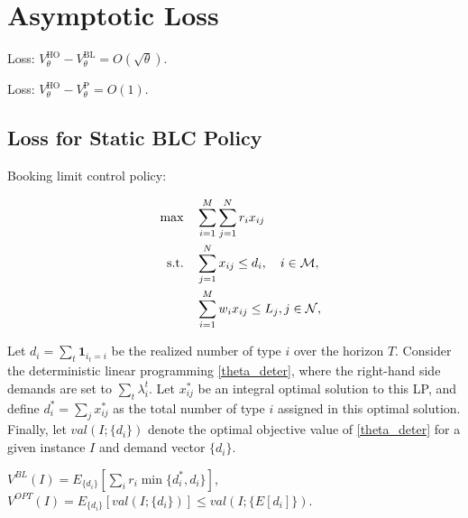 \section{Asymptotic Loss}


\begin{prop}
    Loss: $V_{\theta}^{\text{HO}} - V_{\theta}^{\text{BL}} = O(\sqrt{\theta})$. 
\end{prop}

\begin{prop}
    Loss: $V_{\theta}^{\text{HO}} - V_{\theta}^{\text{P}} = O(1)$. 
\end{prop}



\subsection{Loss for Static BLC Policy}
Booking limit control policy:

\begin{align}
    \quad \max \quad & \sum_{i=1}^{M}  \sum_{j= 1}^{N} r_{i} x_{ij} \label{theta_deter} \\
    \text {s.t.} \quad & \sum_{j= 1}^{N} x_{ij} \leq d_{i}, \quad i \in \mathcal{M}, \notag \\ 
    & \sum_{i=1}^{M} w_{i} x_{ij} \leq L_j, j \in \mathcal{N}, \notag 
\end{align}


Let $d_{i} =\sum_{t} \bm{1}_{i_{t} = i}$ be the realized number of type $i$ over the horizon $T$. 
Consider the deterministic linear programming \eqref{theta_deter}, where the right-hand side demands are set to $\sum_{t} \lambda_{i}^{t}$. Let $x_{ij}^{*}$ be an integral optimal solution to this LP, and define $d_{i}^{*} = \sum_{j} x_{ij}^{*}$ as the total number of type $i$ assigned in this optimal solution. Finally, let $val(I; \{d_{i}\})$ denote the optimal objective value of \eqref{theta_deter} for a given instance $I$ and demand vector $\{d_{i}\}$.

$V^{BL}(I) = E_{\{d_{i}\}}[\sum_{i} r_{i} \min\{d_{i}^{*}, d_{i}\}]$, $V^{OPT}(I) = E_{\{d_{i}\}} [val(I; \{d_{i}\})] \leq val(I; \{E[d_{i}]\})$.


